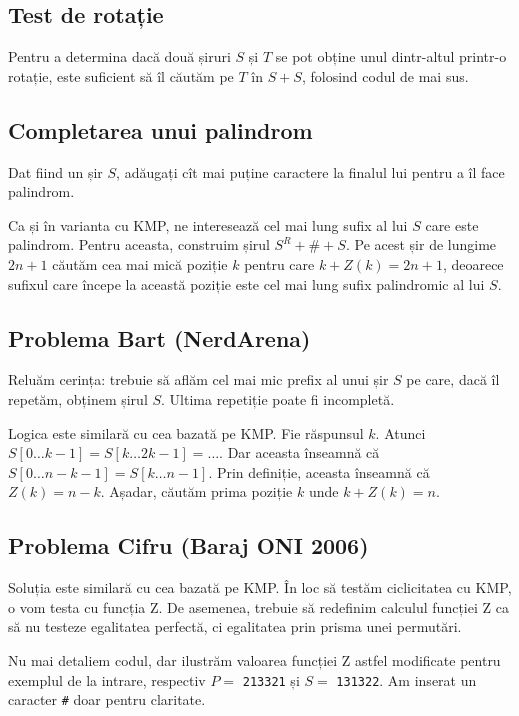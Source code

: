 \documentclass[../main.tex]{subfiles}
\begin{document}
\subsection*{Test de rotație}

Pentru a determina dacă două șiruri $S$ și $T$ se pot obține unul dintr-altul printr-o rotație, este suficient să îl căutăm pe $T$ în $S + S$, folosind codul de mai sus.


\subsection*{Completarea unui palindrom}

Dat fiind un șir $S$, adăugați cît mai puține caractere la finalul lui pentru a îl face palindrom.

Ca și în varianta cu KMP, ne interesează cel mai lung sufix al lui $S$ care este palindrom. Pentru aceasta, construim șirul $S^R + \# + S$. Pe acest șir de lungime $2n + 1$ căutăm cea mai mică poziție $k$ pentru care $k + Z(k) = 2n + 1$, deoarece sufixul care începe la această poziție este cel mai lung sufix palindromic al lui $S$.


\subsection*{Problema Bart (NerdArena)}

Reluăm cerința: trebuie să aflăm cel mai mic prefix al unui șir $S$ pe care, dacă îl repetăm, obținem șirul $S$. Ultima repetiție poate fi incompletă.

Logica este similară cu cea bazată pe KMP. Fie răspunsul $k$. Atunci $S[0 \dots k-1] = S[k \dots 2k-1] = \dots$. Dar aceasta înseamnă că $S[0 \dots n - k - 1] = S[k \dots n - 1]$. Prin definiție, aceasta înseamnă că $Z(k) = n - k$. Așadar, căutăm prima poziție $k$ unde $k + Z(k) = n$.


\subsection*{Problema Cifru (Baraj ONI 2006)}

Soluția este similară cu cea bazată pe KMP. În loc să testăm ciclicitatea cu KMP, o vom testa cu funcția Z. De asemenea, trebuie să redefinim calculul funcției Z ca să nu testeze egalitatea perfectă, ci egalitatea prin prisma unei permutări.

Nu mai detaliem codul, dar ilustrăm valoarea funcției Z astfel modificate pentru exemplul de la intrare, respectiv $P = $ \texttt{213321} și $S = $ \texttt{131322}. Am inserat un caracter \texttt{\#} doar pentru claritate.
\end{document}
